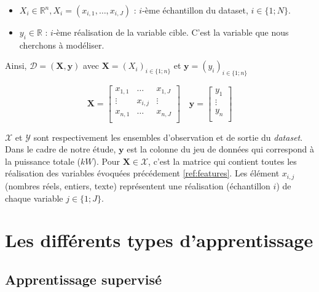 \begin{itemize}
    \item $X_i \in \mathbb{R}^n, X_i = (x_{i,1}, \dots, x_{i,J})$ : $i$-ème échantillon du dataset, $i \in \{1;N\}$.
    \item $y_i \in \mathbb{R}$ : $i$-ème réalisation de la variable cible. C'est la variable que nous cherchons à modéliser. \newline
\end{itemize}

\noindent Ainsi, $\mathcal{D} = (\boldsymbol{X}, \boldsymbol{y})$ avec $\boldsymbol{X} = (X_i)_{i \in \{1;n\}}$ et $\boldsymbol{y} = (y_i)_{i \in \{1;n\}}$

\begin{equation}
    \boldsymbol{X} = 
    \begin{bmatrix}
    x_{1,1} & \dots & x_{1,J} \\
    \vdots & x_{i,j} & \vdots \\
    x_{n,1} & \dots & x_{n,J} \\
    \end{bmatrix} \quad \boldsymbol{y} = 
    \begin{bmatrix}
    y_{1} \\
    \vdots \\
    y_{n} \\
    \end{bmatrix}
\end{equation}

\vspace{1em}

\noindent $\mathcal{X}$ et $\mathcal{Y}$ sont respectivement les ensembles d'observation et de sortie du \textit{dataset}. Dans le cadre de notre étude, $\boldsymbol{y}$ est la colonne du jeu de données 
qui correspond à la puissance totale ($kW$). Pour $\boldsymbol{X} \in \mathcal{X}$, c'est la matrice qui contient toutes les réalisation des variables évoquées précédement \ref{ref:features}. 
Les élément $x_{i,j}$ (nombres réels, entiers, texte) représentent une réalisation (échantillon $i$) de chaque variable $j \in \{ 1;J \}$. 

\chapter{Les différents types d'apprentissage}
\section{Apprentissage supervisé}

